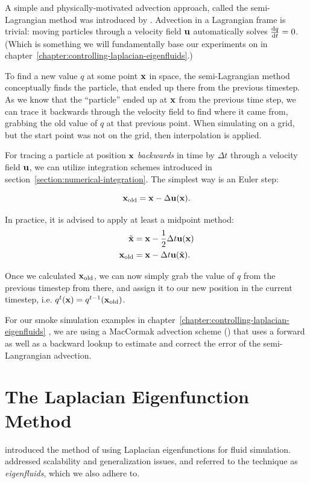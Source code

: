 A simple and physically-motivated advection approach, called the semi-Lagrangian
method was introduced by \cite{StableFluids}.  Advection in a Lagrangian frame
is trivial: moving particles through a velocity field $\vb{u}$ automatically
solves $\dv{q}{t} = 0$. (Which is something we will fundamentally base our
experiments on in chapter~\ref{chapter:controlling-laplacian-eigenfluids}.) 

To find a new value $q$ at some point $\vb{x}$ in space, the semi-Lagrangian
method conceptually finds the particle, that ended up there from the previous
timestep. As we know that the ``particle'' ended up at $\vb{x}$ from the previous
time step, we can trace it backwards through the velocity field to find where it
came from, grabbing the old value of $q$ at that previous point. When simulating
on a grid, but the start point was not on the grid, then interpolation is
applied.

For tracing a particle at position $\vb{x}$ \textit{backwards} in time by
$\Delta t$ through a velocity field $\vb{u}$, we can utilize integration schemes
introduced in section~\ref{section:numerical-integration}.  The simplest way is
an Euler step: 

$$\vb{x}_{\text{old}} = \vb{x} - \Delta \vb{u}(\vb{x}).$$

In practice, it is advised to apply at least a midpoint method: 
\begin{align*}
    \tilde{\vb{x}} &= \vb{x} - \frac{1}{2}\Delta t \vb{u}(\vb{x})\\
    \vb{x}_{\text{old}} &= \vb{x} - \Delta t \vb{u}(\tilde{\vb{x}}).
\end{align*}

Once we calculated $\vb{x}_{\text{old}}$, we can now simply grab the value of
$q$ from the previous timestep from there, and assign it to our new position in
the current timestep, i.e. $q^{t}(\vb{x}) = q^{t-1}(\vb{x}_{\text{old}})$.

For our smoke simulation examples in
chapter~\ref{chapter:controlling-laplacian-eigenfluids} , we are using
a MacCormak advection scheme (\cite{maccormack}) that uses a forward as well as
a backward lookup to estimate and correct the error of the semi-Langrangian
advection.

\section{The Laplacian Eigenfunction Method}
\label{section:laplacian-eigenfluids}
\cite{dewitt} introduced the method of using Laplacian eigenfunctions for fluid
simulation. \cite{scalable-eigenfluids} addressed scalability and generalization
issues, and referred to the technique as \textit{eigenfluids}, which we also
adhere to.

